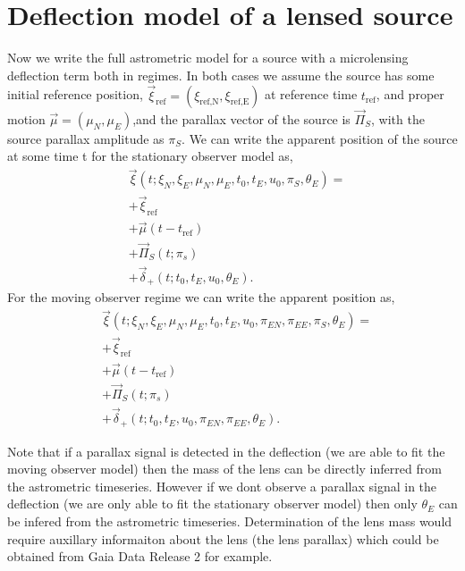 \documentclass[11pt]{article}
\begin{document}
\section{Deflection model of a lensed source}

Now we write the full astrometric model for a source with a microlensing deflection term both in regimes.
In both cases we assume the source has some initial reference position, 
$\vec{\xi}_{\text{ref}}=(\xi_{\text{ref,N}},\xi_{\text{ref,E}})$ at reference time $t_{\text{ref}}$, 
and proper motion $\vec{\mu}=(\mu_{N},\mu_{E})$,and the parallax vector of the source is $\vec{\Pi}_{S}$, with the
source parallax amplitude as $\pi_{S}$. We can write the apparent position of the 
source at some time t for the stationary observer model as,
%
\begin{equation}
\begin{aligned}
&\vec{\xi}(t;\xi_{N},\xi_{E},\mu_{N},\mu_{E},t_{0},t_{E},u_{0},\pi_{S},\theta_{E}) = \\
&+\vec{\xi}_{\text{ref}} \\
&+\vec{\mu}(t-t_{\text{ref}}) \\
&+\vec{\Pi}_{S}(t;\pi_{s})\\
&+\vec{\delta}_{+}(t;t_{0},t_{E},u_{0},\theta_{E}).
\end{aligned}
\end{equation}
%
For the moving observer regime we can write the apparent position as, 
\begin{equation}
\begin{aligned}
&\vec{\xi}(t;\xi_{N},\xi_{E},\mu_{N},\mu_{E},t_{0},t_{E},u_{0},\pi_{EN},\pi_{EE},\pi_{S},\theta_{E}) = \\
&+\vec{\xi}_{\text{ref}} \\
&+\vec{\mu}(t-t_{\text{ref}}) \\
&+\vec{\Pi}_{S}(t;\pi_{s})\\
&+\vec{\delta}_{+}(t;t_{0},t_{E},u_{0},\pi_{EN},\pi_{EE},\theta_{E}).
\end{aligned}
\end{equation}

Note that if a parallax signal is detected in the deflection (we are able to fit the moving observer model) 
then the mass of the lens can be directly inferred from the astrometric timeseries. However if we dont observe
a parallax signal in the deflection (we are only able to fit the stationary observer model) then only $\theta_{E}$
can be infered from the astrometric timeseries. Determination of the lens mass would require auxillary informaiton
about the lens (the lens parallax) which could be obtained from Gaia Data Release 2 for example.


 

\end{document}
